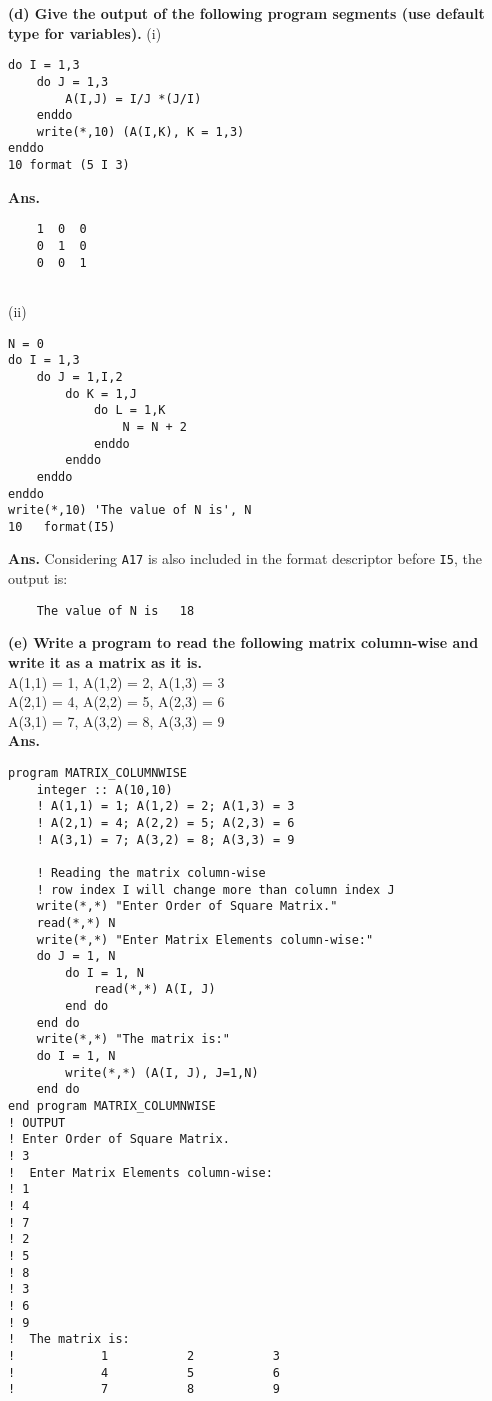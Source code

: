 \documentclass[11pt]{article} %
\begin{document}
\newpage
\textbf{(d) Give the output of the following program segments (use default type for variables).
}
(i)
\begin{lstlisting}
do I = 1,3
    do J = 1,3
        A(I,J) = I/J *(J/I)
    enddo
    write(*,10) (A(I,K), K = 1,3)
enddo
10 format (5 I 3)
\end{lstlisting}
\textbf{Ans.}
\begin{verbatim}
    1  0  0
    0  1  0
    0  0  1
  
\end{verbatim}
(ii)
\begin{lstlisting}
N = 0
do I = 1,3
    do J = 1,I,2
        do K = 1,J
            do L = 1,K
                N = N + 2
            enddo
        enddo
    enddo
enddo
write(*,10) 'The value of N is', N
10   format(I5)
\end{lstlisting}
\textbf{Ans.} Considering \lstinline{A17} is also included in the format descriptor before \lstinline{I5}, the output is:
\begin{verbatim}
    The value of N is   18

\end{verbatim}
\textbf{(e) Write a program to read the following matrix column-wise and write it as a matrix as it is.}\\
A(1,1) = 1, A(1,2) = 2, A(1,3) = 3 \\
A(2,1) = 4, A(2,2) = 5, A(2,3) = 6  \\
A(3,1) = 7, A(3,2) = 8, A(3,3) = 9 \\
\textbf{Ans.} 
\begin{lstlisting}
program MATRIX_COLUMNWISE
    integer :: A(10,10)
    ! A(1,1) = 1; A(1,2) = 2; A(1,3) = 3
    ! A(2,1) = 4; A(2,2) = 5; A(2,3) = 6
    ! A(3,1) = 7; A(3,2) = 8; A(3,3) = 9

    ! Reading the matrix column-wise
    ! row index I will change more than column index J
    write(*,*) "Enter Order of Square Matrix."
    read(*,*) N
    write(*,*) "Enter Matrix Elements column-wise:"
    do J = 1, N
        do I = 1, N
            read(*,*) A(I, J)
        end do
    end do
    write(*,*) "The matrix is:"
    do I = 1, N
        write(*,*) (A(I, J), J=1,N)
    end do
end program MATRIX_COLUMNWISE
! OUTPUT
! Enter Order of Square Matrix.
! 3
!  Enter Matrix Elements column-wise:
! 1
! 4
! 7
! 2
! 5
! 8
! 3
! 6
! 9
!  The matrix is:
!            1           2           3
!            4           5           6
!            7           8           9


\end{lstlisting}
\end{document}
